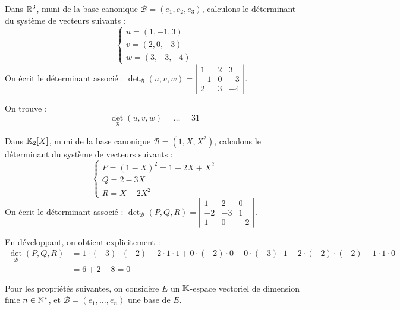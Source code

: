 \documentclass[12pt, a4paper]{report}
\begin{document}
\begin{example}
    Dans $\mathbb{R}^3$, muni de la base canonique $\mathcal{B} = (e_1, e_2, e_3)$, calculons le déterminant du système de vecteurs suivants :
    $$\begin{cases}
        u = (1,-1,3) \\
        v = (2,0,-3) \\
        w = (3,-3,-4)
    \end{cases}$$
    On écrit le déterminant associé : $\det_{\mathcal{B}}(u,v,w) = \left|\begin{matrix} 1 & 2 & 3 \\ -1 & 0 & -3 \\ 2 & 3 & -4 \end{matrix}\right|$.

    On trouve :
    $$\det_{\mathcal{B}}(u,v,w) = \dots = 31$$
\end{example}

\begin{example}
    Dans $\mathbb{K}_2[X]$, muni de la base canonique $\mathcal{B} = (1, X, X^2)$, calculons le déterminant du système de vecteurs suivants :
    $$\begin{cases}
        P = (1-X)^2 = 1 - 2X + X^2 \\
        Q = 2-3X \\
        R = X - 2X^2
    \end{cases}$$
    On écrit le déterminant associé : $\det_{\mathcal{B}}(P,Q,R) = \left|\begin{matrix} 1 & 2 & 0 \\ -2 & -3 & 1 \\ 1 & 0 & -2 \end{matrix}\right|$.
    
    En développant, on obtient explicitement :
    \begin{align*}
        \det_{\mathcal{B}}(P,Q,R) &= 1 \cdot (-3) \cdot (-2) + 2 \cdot 1 \cdot 1 + 0 \cdot (-2) \cdot 0 - 0 \cdot (-3) \cdot 1 - 2 \cdot (-2) \cdot (-2) - 1 \cdot 1 \cdot 0 \\
        &= 6 + 2 - 8 = 0
    \end{align*}
\end{example}

Pour les propriétés suivantes, on considère $E$ un $\mathbb{K}$-espace vectoriel de dimension finie $n \in \mathbb{N}^*$, et $\mathcal{B} = (e_1, \dots, e_n)$ une base de $E$. 
\end{document}
